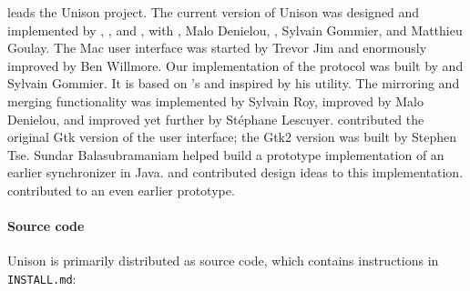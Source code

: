 \documentclass{article}
\begin{document}


 leads the
Unison project.
%
The current version of Unison was designed and implemented by
    ,
    ,
and
    ,
with
    ,
    {Malo Denielou},
    ,
    Sylvain Gommier, and
    Matthieu Goulay.
%
The Mac user interface was started by Trevor Jim and enormously improved by
Ben Willmore.
%
Our implementation of the
  protocol was built by
  and Sylvain Gommier.  It is based on
  's
  and inspired by his
  utility.
%
The mirroring and merging functionality was implemented by
  Sylvain Roy, improved by Malo Denielou, and improved yet further by
  St\'ephane Lescuyer.
%
 contributed the original Gtk version of the user
  interface; the Gtk2 version was built by Stephen Tse.
%
Sundar Balasubramaniam helped build a prototype implementation of
an earlier synchronizer in Java.
and
 contributed design
ideas to this implementation.
contributed to an even earlier prototype.


\paragraph{Source code}

Unison is primarily distributed as source code, which contains
instructions in {\tt INSTALL.md}:
\begin{quote}
\end{quote}
\end{document}
